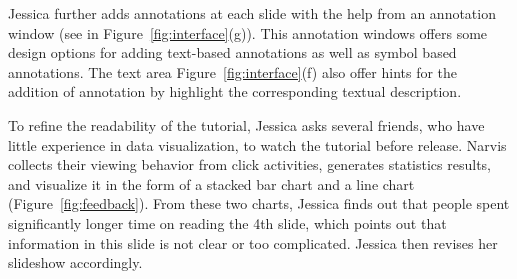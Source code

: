 Jessica further adds annotations at each slide with the help from an annotation window (see in Figure~\ref{fig:interface}(g)). This annotation windows offers some design options for adding text-based annotations as well as symbol based annotations.  The text area Figure~\ref{fig:interface}(f) also offer hints for the addition of annotation by highlight the corresponding textual description. 


To refine the readability of the tutorial, Jessica asks several friends, who have little experience in data visualization, to watch the tutorial before release. Narvis collects their viewing behavior from click activities, generates statistics results, and visualize it in the form of a stacked bar chart and a line chart (Figure~\ref{fig:feedback}). From these two charts, Jessica finds out that people spent significantly longer time on reading the 4th slide, which points out that information in this slide is not clear or too complicated. Jessica then revises her slideshow accordingly. 



